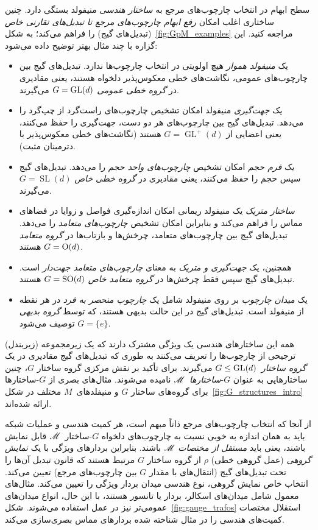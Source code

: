 سطح ابهام در انتخاب چارچوب‌های مرجع به \emph{ساختار هندسی} منیفولد بستگی دارد.
چنین ساختاری اغلب امکان \emph{رفع ابهام چارچوب‌های مرجع تا تبدیل‌های تقارنی خاص} (تبدیل‌های گیج) را فراهم می‌کند؛ به شکل~\ref{fig:GpM_examples} مراجعه کنید.
این گزاره با چند مثال بهتر توضیح داده می‌شود:
\begin{itemize}[leftmargin=1.2cm]
	\item[{\rule[2.2pt]{2pt}{2pt}}]
	یک \emph{منیفولد هموار} هیچ اولویتی در انتخاب چارچوب‌ها ندارد.
	تبدیل‌های گیج بین چارچوب‌های عمومی، نگاشت‌های خطی معکوس‌پذیر دلخواه هستند، یعنی مقادیری در \emph{گروه خطی عمومی} ${G=\operatorname{GL}(d)}$ می‌گیرند.
	\item[{\rule[2.2pt]{2pt}{2pt}}]
	یک \emph{جهت‌گیری} منیفولد امکان تشخیص چارچوب‌های راست‌گرد از چپ‌گرد را می‌دهد.
	تبدیل‌های گیج بین چارچوب‌های هر دو دست، جهت‌گیری را حفظ می‌کنند، یعنی اعضایی از ${G=\operatorname{GL}^+(d)}$ هستند (نگاشت‌های خطی معکوس‌پذیر با دترمینان مثبت).
	\item[{\rule[2.2pt]{2pt}{2pt}}]
	یک \emph{فرم حجم} امکان تشخیص \emph{چارچوب‌های واحد حجم} را می‌دهد.
	تبدیل‌های گیج سپس حجم را حفظ می‌کنند، یعنی مقادیری در \emph{گروه خطی خاص} $G=\operatorname{SL}(d)$ می‌گیرند.
	\item[{\rule[2.2pt]{2pt}{2pt}}]
	\emph{ساختار متریک} یک منیفولد ریمانی امکان اندازه‌گیری فواصل و زوایا در فضاهای مماس را فراهم می‌کند و بنابراین امکان تشخیص \emph{چارچوب‌های متعامد} را می‌دهد.
	تبدیل‌های گیج بین چارچوب‌های متعامد، چرخش‌ها و بازتاب‌ها در \emph{گروه متعامد} $G=\operatorname{O}(d)$ هستند.
	\item[{\rule[2.2pt]{2pt}{2pt}}]
	همچنین، یک \emph{جهت‌گیری و متریک} به معنای \emph{چارچوب‌های متعامد جهت‌دار} است.
	تبدیل‌های گیج سپس فقط چرخش‌ها در \emph{گروه متعامد خاص} $G=\operatorname{SO}(d)$ هستند.
	\item[{\rule[2.2pt]{2pt}{2pt}}]
	یک \emph{میدان چارچوب} بر روی منیفولد شامل یک \emph{چارچوب منحصر به فرد} در هر نقطه از منیفولد است.
	تبدیل‌های گیج در این حالت بدیهی هستند، که توسط \emph{گروه بدیهی} $G=\{e\}$ توصیف می‌شود.
\end{itemize}
همه این ساختارهای هندسی یک ویژگی مشترک دارند که یک زیرمجموعه (زیربندل) ترجیحی از چارچوب‌ها را تعریف می‌کنند به طوری که تبدیل‌های گیج مقادیری در یک \emph{گروه ساختار}~$G\leq\operatorname{GL}(d)$ می‌گیرند.
برای تأکید بر نقش مرکزی گروه ساختار $G$، چنین ساختارهایی به عنوان $G$-\emph{ساختارها}~$\mathscr{M}$ نامیده می‌شوند.
مثال‌های بصری از $G$-ساختارها برای گروه‌های ساختار $G$ و منیفلدهای~$M$ مختلف در شکل~\ref{fig:G_structures_intro} ارائه شده‌اند.


از آنجا که انتخاب چارچوب‌های مرجع ذاتاً مبهم است، هر کمیت هندسی و عملیات شبکه باید به همان اندازه به خوبی نسبت به چارچوب‌های دلخواه $G$-ساختار~$\mathscr{M}$ قابل نمایش باشند، یعنی باید \emph{مستقل از مختصات} $\mathscr{M}$ باشند.
بنابراین بردارهای ویژگی با یک \emph{نمایش گروهی} (عمل گروهی خطی) $\rho$ از گروه ساختار $G$ مرتبط هستند که قانون تبدیل آن‌ها را تحت تبدیل‌های گیج (انتقال‌های با مقدار $G$ بین چارچوب‌های مرجع) تعیین می‌کند.
انتخاب خاص نمایش گروهی، نوع هندسی میدان بردار ویژگی را تعیین می‌کند.
مثال‌های معمول شامل میدان‌های اسکالر، بردار یا تانسور هستند، با این حال، انواع میدان‌های عمومی‌تر نیز در عمل استفاده می‌شوند.
شکل~\ref{fig:gauge_trafos} استقلال مختصات کمیت‌های هندسی را در مثال شناخته شده بردارهای مماس بصری‌سازی می‌کند.


